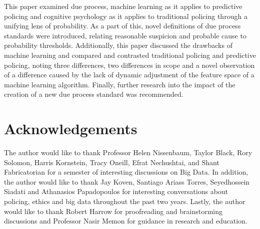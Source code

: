 \documentclass[12pt]{article} %
\begin{document}
This paper examined due process, machine learning as it applies to predictive policing and cognitive psychology as it applies to traditional policing through a unifying lens of probability. As a part of this, novel definitions of due process standards were introduced, relating reasonable suspicion and probable cause to probability thresholds. Additionally, this paper discussed the drawbacks of machine learning and compared and contrasted traditional policing and predictive policing, noting three differences, two differences in scope and a novel observation of a difference caused by the lack of dynamic adjustment of the feature space of a machine learning algorithm. Finally, further research into the impact of the creation of a new due process standard was recommended. 

\section{Acknowledgements}
The author would like to thank Professor Helen Nissenbaum, Taylor Black, Rory Solomon, Harris Kornstein, Tracy Oneill, Efrat Nechushtai, and Shant Fabricatorian for a semester of interesting discussions on Big Data. In addition, the author would like to thank Jay Koven, Santiago Ariass Torres, Seyedhossein Siadati and Athanasios Papadopoulos for interesting conversations about policing, ethics and big data throughout the past two years. Lastly, the author would like to thank Robert Harrow for proofreading and brainstorming discussions and Professor Nasir Memon for guidance in research and education.
\newpage




\end{document}
